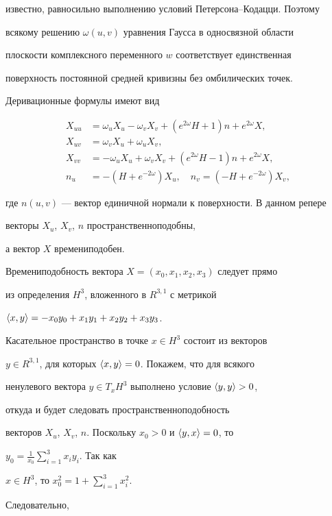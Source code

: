 известно, равносильно выполнению условий Петерсона--Кодацци. Поэтому


всякому решению $\omega (u,v)$ уравнения Гаусса в односвязной области


плоскости комплексного переменного $w$ соответствует единственная


поверхность постоянной средней кривизны без омбилических точек.


Деривационные формулы имеют вид


\begin{align*}


X_{uu}&=\omega_uX_u-\omega_vX_v+(e^{2\omega}H+1)n+e^{2\omega}X,\\


X_{uv}&=\omega_vX_u+\omega_uX_v,\\


X_{vv}&=-\omega_uX_u+\omega_vX_v+(e^{2\omega}H-1)n+e^{2\omega}X,\\


n_u&=-(H+e^{-2\omega})X_u,\quad n_v=(-H+e^{-2\omega})X_v,


\end{align*}


где $n(u,v)$ --- вектор единичной нормали к поверхности. В данном репере


векторы $X_u$, $X_v$, $n$ пространственноподобны,


а вектор $X$ времениподобен.





Времениподобность вектора $X=(x_0,x_1,x_2,x_3)$ следует прямо


из определения $H^3$, вложенного в $R^{3,1}$ с метрикой


$\langle x,y\rangle=-x_0y_0+x_1y_1+x_2y_2+x_3y_3$.


Касательное пространство в точке $x\in H^3$ состоит из векторов


$y\in R^{3,1}$, для которых $\langle x,y\rangle=0$. Покажем, что для всякого


ненулевого вектора $y\in T_x H^3$ выполнено условие $\langle y,y\rangle>0$,


откуда и будет следовать пространственноподобность


векторов $X_u$, $X_v$, $n$. Поскольку $x_0>0$ и $\langle y,x\rangle=0$, то


$y_0=\frac{1}{x_0}\sum\limits^3_{i=1}x_i y_i$. Так как


$x\in H^3$, то $x^2_0=1+\sum\limits^3_{i=1}x^2_i$.


Следовательно,


